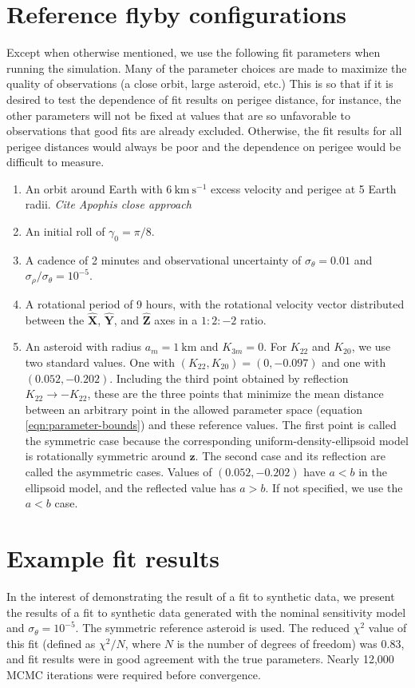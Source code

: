\documentclass{aastex631}
\newcommand{\unit}[1]{\hat{\bm{#1}}}
\newcommand{\jtd}[1]{{\color{red}\textit{#1}}}
\newcommand{\siunit}[1]{\ \textrm{#1}}
\newcommand{\per}[1]{\ \textrm{#1}^{-1}}
\begin{document}
\section{Reference flyby configurations}
\label{app:reference-config}
Except when otherwise mentioned, we use the following fit parameters when running the simulation. Many of the parameter choices are made to maximize the quality of observations (a close orbit, large asteroid, etc.) This is so that if it is desired to test the dependence of fit results on perigee distance, for instance, the other parameters will not be fixed at values that are so unfavorable to observations that good fits are already excluded. Otherwise, the fit results for all perigee distances would always be poor and the dependence on perigee would be difficult to measure.
\begin{enumerate}
  \item An orbit around Earth with $6\siunit{km}\per{s}$ excess velocity and perigee at 5 Earth radii. \jtd{Cite Apophis close approach}
  \item An initial roll of $\gamma_0=\pi/8$.
  \item A cadence of 2 minutes and observational uncertainty of $\sigma_\theta = 0.01$ and $\sigma_\rho / \sigma_\theta = 10^{-5}$.
  \item A rotational period of 9 hours, with the rotational velocity vector distributed between the $\unit X$, $\unit Y$, and $\unit Z$ axes in a $1:2:-2$ ratio.
  \item An asteroid with radius $a_m = 1\siunit{km}$ and $K_{3m}=0$. For $K_{22}$ and $K_{20}$, we use two standard values. One with $(K_{22}, K_{20}) = (0, -0.097)$ and one with $(0.052, -0.202)$. Including the third point obtained by reflection $K_{22}\rightarrow -K_{22}$, these are the three points that minimize the mean distance between an arbitrary point in the allowed parameter space (equation \ref{eqn:parameter-bounds}) and these reference values. The first point is called the symmetric case because the corresponding uniform-density-ellipsoid model is rotationally symmetric around $\unit z$. The second case and its reflection are called the asymmetric cases. Values of $(0.052, -0.202)$ have $a < b$ in the ellipsoid model, and the reflected value has $a > b$. If not specified, we use the $a < b$ case. 
\end{enumerate}



\section{Example fit results}
In the interest of demonstrating the result of a fit to synthetic data, we present the results of a fit to synthetic data generated with the nominal sensitivity model and $\sigma_\theta = 10^{-5}$. The symmetric reference asteroid is used. The reduced $\chi^2$ value of this fit (defined as $\chi^2 / N$, where $N$ is the number of degrees of freedom) was 0.83, and fit results were in good agreement with the true parameters. Nearly 12,000 MCMC iterations were required before convergence.
\end{document}
